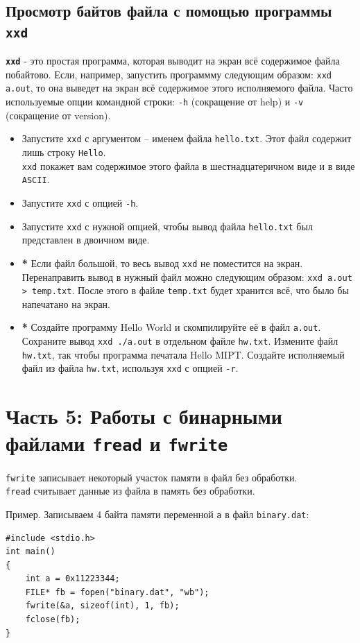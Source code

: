 \documentclass{article}
\begin{document}
\subsection*{Просмотр байтов файла с помощью программы \texttt{xxd}}
\textbf{\texttt{xxd}} - это простая программа, которая выводит на экран всё содержимое файла побайтово. Если, например, запустить программму следующим образом:
\texttt{xxd a.out}, то она выведет на экран всё содержимое этого исполняемого файла. Часто используемые опции командной строки: \texttt{-h} (сокращение от help) и \texttt{-v} (сокращение от version).
\begin{itemize}
\item Запустите \texttt{xxd} с аргументом -- именем файла \texttt{hello.txt}. Этот файл содержит лишь строку \texttt{Hello}.\\ 
\texttt{xxd} покажет вам содержимое этого файла в шестнадцатеричном виде и в виде \texttt{ASCII}.
\item Запустите \texttt{xxd} с опцией \texttt{-h}.
\item Запустите \texttt{xxd} с нужной опцией, чтобы вывод файла \texttt{hello.txt} был представлен в двоичном виде.
\item \textbf{*} Если файл большой, то весь вывод \texttt{xxd} не поместится на экран. Перенаправить вывод в нужный файл можно следующим образом:
\texttt{xxd a.out > temp.txt}. После этого в файле \texttt{temp.txt} будет хранится всё, что было бы напечатано на экран.
\item \textbf{*} Создайте программу Hello World и скомпилируйте её в файл \texttt{a.out}. Сохраните вывод \texttt{xxd ./a.out} в отдельном файле \texttt{hw.txt}. Измените файл \texttt{hw.txt}, так чтобы программа печатала Hello MIPT. Создайте исполняемый файл из файла \texttt{hw.txt}, используя \texttt{xxd} с опцией \texttt{-r}.
\end{itemize}




\section*{Часть 5: Работы с бинарными файлами \texttt{fread} и \texttt{fwrite}}


\texttt{fwrite} записывает некоторый участок памяти в файл без обработки. \\
\texttt{fread} считывает данные из файла в память без обработки.

Пример. Записываем 4 байта памяти переменной \texttt{a} в файл \texttt{binary.dat}:
\begin{lstlisting}
#include <stdio.h>
int main() 
{
    int a = 0x11223344;
    FILE* fb = fopen("binary.dat", "wb");
    fwrite(&a, sizeof(int), 1, fb);
    fclose(fb);
}
\end{lstlisting}
\end{document}
